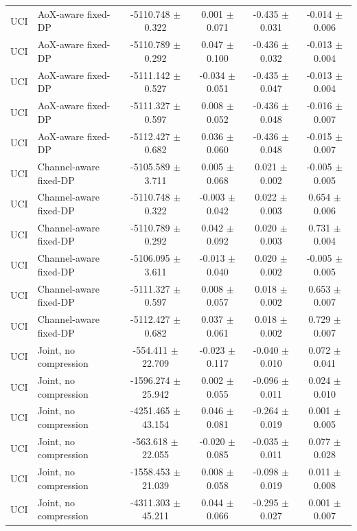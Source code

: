 \begin{table}[t]
\begin{tabular}{llcccc}
UCI & AoX-aware fixed-DP & -5110.748 $\pm$ 0.322 & 0.001 $\pm$ 0.071 & -0.435 $\pm$ 0.031 & -0.014 $\pm$ 0.006 \\
UCI & AoX-aware fixed-DP & -5110.789 $\pm$ 0.292 & 0.047 $\pm$ 0.100 & -0.436 $\pm$ 0.032 & -0.013 $\pm$ 0.004 \\
UCI & AoX-aware fixed-DP & -5111.142 $\pm$ 0.527 & -0.034 $\pm$ 0.051 & -0.435 $\pm$ 0.047 & -0.013 $\pm$ 0.004 \\
UCI & AoX-aware fixed-DP & -5111.327 $\pm$ 0.597 & 0.008 $\pm$ 0.052 & -0.436 $\pm$ 0.048 & -0.016 $\pm$ 0.007 \\
UCI & AoX-aware fixed-DP & -5112.427 $\pm$ 0.682 & 0.036 $\pm$ 0.060 & -0.436 $\pm$ 0.048 & -0.015 $\pm$ 0.007 \\
UCI & Channel-aware fixed-DP & -5105.589 $\pm$ 3.711 & 0.005 $\pm$ 0.068 & 0.021 $\pm$ 0.002 & -0.005 $\pm$ 0.005 \\
UCI & Channel-aware fixed-DP & -5110.748 $\pm$ 0.322 & -0.003 $\pm$ 0.042 & 0.022 $\pm$ 0.003 & 0.654 $\pm$ 0.006 \\
UCI & Channel-aware fixed-DP & -5110.789 $\pm$ 0.292 & 0.042 $\pm$ 0.092 & 0.020 $\pm$ 0.003 & 0.731 $\pm$ 0.004 \\
UCI & Channel-aware fixed-DP & -5106.095 $\pm$ 3.611 & -0.013 $\pm$ 0.040 & 0.020 $\pm$ 0.002 & -0.005 $\pm$ 0.005 \\
UCI & Channel-aware fixed-DP & -5111.327 $\pm$ 0.597 & 0.008 $\pm$ 0.057 & 0.018 $\pm$ 0.002 & 0.653 $\pm$ 0.007 \\
UCI & Channel-aware fixed-DP & -5112.427 $\pm$ 0.682 & 0.037 $\pm$ 0.061 & 0.018 $\pm$ 0.002 & 0.729 $\pm$ 0.007 \\
UCI & Joint, no compression & -554.411 $\pm$ 22.709 & -0.023 $\pm$ 0.117 & -0.040 $\pm$ 0.010 & 0.072 $\pm$ 0.041 \\
UCI & Joint, no compression & -1596.274 $\pm$ 25.942 & 0.002 $\pm$ 0.055 & -0.096 $\pm$ 0.011 & 0.024 $\pm$ 0.010 \\
UCI & Joint, no compression & -4251.465 $\pm$ 43.154 & 0.046 $\pm$ 0.081 & -0.264 $\pm$ 0.019 & 0.001 $\pm$ 0.005 \\
UCI & Joint, no compression & -563.618 $\pm$ 22.055 & -0.020 $\pm$ 0.085 & -0.035 $\pm$ 0.011 & 0.077 $\pm$ 0.028 \\
UCI & Joint, no compression & -1558.453 $\pm$ 21.039 & 0.008 $\pm$ 0.058 & -0.098 $\pm$ 0.019 & 0.011 $\pm$ 0.008 \\
UCI & Joint, no compression & -4311.303 $\pm$ 45.211 & 0.044 $\pm$ 0.066 & -0.295 $\pm$ 0.027 & 0.001 $\pm$ 0.007 \\

\end{tabular}
\end{table}
